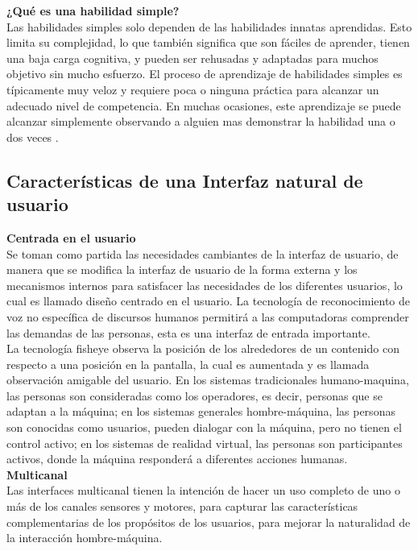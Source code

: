 \textbf{¿Qué es una habilidad simple?} \\

Las habilidades simples solo dependen de las habilidades innatas aprendidas. Esto limita su complejidad, lo que también significa que son fáciles de aprender, tienen una baja carga cognitiva, y pueden ser rehusadas y adaptadas para muchos objetivo sin mucho esfuerzo. El proceso de aprendizaje de habilidades simples es típicamente muy veloz y requiere poca o ninguna práctica para alcanzar un adecuado nivel de competencia. En muchas ocasiones, este aprendizaje se puede alcanzar simplemente observando a alguien mas demonstrar la habilidad una o dos veces \cite{Blake}.

\subsection{Características de una Interfaz natural de usuario} 

\textbf{Centrada en el usuario} \\

Se toman como partida las necesidades cambiantes de la interfaz de usuario, de manera que se modifica la interfaz de usuario de la forma externa y los mecanismos internos para satisfacer las necesidades de los diferentes usuarios, lo cual es llamado diseño centrado en el usuario. La tecnología de reconocimiento de voz no específica de discursos humanos permitirá a las computadoras comprender las demandas de las personas, esta es una interfaz de entrada importante. \\

La tecnología fisheye observa la posición de los alrededores de un contenido con respecto a una posición en la pantalla, la cual es aumentada y es llamada observación amigable del usuario. En los sistemas tradicionales humano-maquina, las personas son consideradas como los operadores, es decir, personas que se adaptan a la máquina; en los sistemas generales hombre-máquina, las personas son conocidas como usuarios, pueden dialogar con la máquina, pero no tienen el control activo; en los sistemas de realidad virtual, las personas son participantes activos, donde la máquina responderá a diferentes acciones humanas. \\

\textbf{Multicanal} \\

Las interfaces multicanal tienen la intención de hacer un uso completo de uno o más de los canales sensores y motores, para capturar las características complementarias de los propósitos de los usuarios, para mejorar la naturalidad de la interacción hombre-máquina. \\

